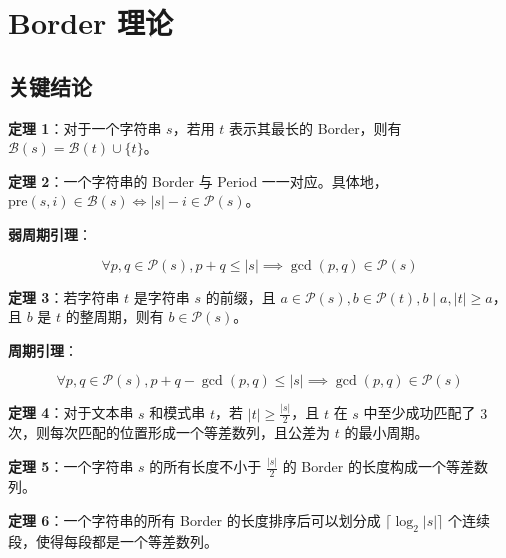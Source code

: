 \section{Border 理论}

\subsection{关键结论}

\begin{tcolorbox}
\textbf{定理 1}：对于一个字符串 $s$，若用 $t$ 表示其最长的 Border，则有 $\mathcal{B}(s) = \mathcal{B}(t) \cup \{t\}$。
\end{tcolorbox}

\begin{tcolorbox}
\textbf{定理 2}：一个字符串的 Border 与 Period 一一对应。具体地，$\mathrm{pre}(s, i) \in \mathcal{B}(s) \iff |s| - i \in \mathcal{P}(s)$。
\end{tcolorbox}

\begin{tcolorbox}
\textbf{弱周期引理}：

$$
\forall p, q\in\mathcal{P}(s), p + q \le |s| \implies \gcd(p, q)\in\mathcal{P}(s)
$$
\end{tcolorbox}

\begin{tcolorbox}
\textbf{定理 3}：若字符串 $t$ 是字符串 $s$ 的前缀，且 $a \in \mathcal{P}(s), b \in \mathcal{P}(t), b \mid a, |t| \ge a$，且 $b$ 是 $t$ 的整周期，则有 $b \in \mathcal{P}(s)$。
\end{tcolorbox}

\begin{tcolorbox}
\textbf{周期引理}：

$$
\forall p, q\in\mathcal{P}(s), p + q - \gcd(p, q) \le |s| \implies \gcd(p, q)\in\mathcal{P}(s)
$$
\end{tcolorbox}

\begin{tcolorbox}
\textbf{定理 4}：对于文本串 $s$ 和模式串 $t$，若 $|t| \ge \frac{|s|}{2}$，且 $t$ 在 $s$ 中至少成功匹配了 $3$ 次，则每次匹配的位置形成一个等差数列，且公差为 $t$ 的最小周期。
\end{tcolorbox}

\begin{tcolorbox}
\textbf{定理 5}：一个字符串 $s$ 的所有长度不小于 $\frac{|s|}{2}$ 的 Border 的长度构成一个等差数列。
\end{tcolorbox}

\begin{tcolorbox}
\textbf{定理 6}：一个字符串的所有 Border 的长度排序后可以划分成 $\lceil\log_2|s|\rceil$ 个连续段，使得每段都是一个等差数列。
\end{tcolorbox}


